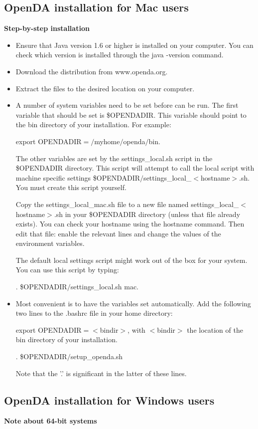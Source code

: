 \subsection{OpenDA installation for Mac users}
\textbf{Step-by-step installation}

\begin{itemize}
\item Ensure that Java version 1.6 or higher is installed on your computer. You can check which version is installed through the java -version command.
\item Download the \oda distribution from www.openda.org.
\item Extract the \oda files to the desired location on your computer.
\item A number of system variables need to be set before \oda can be run. The first variable that should be set is \$OPENDADIR. This variable should point to the bin directory of your \oda installation. For example:

export OPENDADIR$=/$myhome$/$openda$/$bin.

The other variables are set by the settings\_local.sh script in the \$OPENDADIR directory. This script will attempt to call the local script with machine specific settings \$OPENDADIR$/$settings\_local\_$<$hostname$>$.sh. You must create this script yourself.

Copy the settings\_local\_mac.sh file to a new file named settings\_local\_$<$hostname$>$.sh in your \$OPENDADIR directory (unless that file already exists). You can check your hostname using the hostname command. Then edit that file: enable the relevant lines and change the values of the environment variables.

The default local settings script might work out of the box for your system. You can use this script by typing:

. \$OPENDADIR$/$settings\_local.sh mac.
\item Most convenient is to have the variables set automatically. Add the following two lines to the .bashrc file in your home directory:

export OPENDADIR$=<$bindir$>$, with $<$bindir$>$ the location of the bin directory of your \oda installation.

. \$OPENDADIR$/$setup\_openda.sh

Note that the '.' is significant in the latter of these lines.
\end{itemize}

\subsection{OpenDA installation for Windows users}
\textbf{Note about 64-bit systems}


